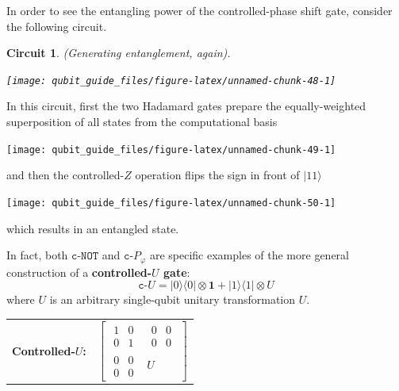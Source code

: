 \documentclass[fleqn,a4paper]{article}
\newenvironment{idea}{\everypar{\setlength{\parindent}{1.5em}}}{}
\newtheorem*{circuit}{Circuit}
\theoremstyle{definition}
\theoremstyle{definition}
\theoremstyle{definition}
\theoremstyle{definition}
\theoremstyle{remark}
\begin{document}
In order to see the entangling power of the controlled-phase shift gate, consider the following circuit.

\begin{circuit}

\emph{(Generating entanglement, again).}

\begin{center}\texttt{[image: qubit\_guide\_files/figure-latex/unnamed-chunk-48-1]} \end{center}

\end{circuit}

In this circuit, first the two Hadamard gates prepare the equally-weighted superposition of all states from the computational basis

\begin{center}\texttt{[image: qubit\_guide\_files/figure-latex/unnamed-chunk-49-1]} \end{center}

and then the controlled-\(Z\) operation flips the sign in front of \(|11\rangle\)

\begin{center}\texttt{[image: qubit\_guide\_files/figure-latex/unnamed-chunk-50-1]} \end{center}

which results in an entangled state.

In fact, both \(\texttt{c-NOT}\) and \(\texttt{c-}P_\varphi\) are specific examples of the more general construction of a \textbf{controlled-\(U\) gate}:
\[
  \texttt{c-}U
  = |0\rangle\langle 0|\otimes\mathbf{1}+ |1\rangle\langle 1|\otimes U
\]
where \(U\) is an arbitrary single-qubit unitary transformation \(U\).

\begin{idea}

\centering
\begin{tabular}{ll}
  \textbf{Controlled-$U$:}
  & $\left[\begin{array}{c|c}\begin{matrix}1&0\\0&1\end{matrix}&\begin{matrix}0&0\\0&0\end{matrix}\\\hline\begin{matrix}0&0\\0&0\end{matrix}&U\end{array}\right]$
\end{tabular}

\end{idea}
\end{document}
